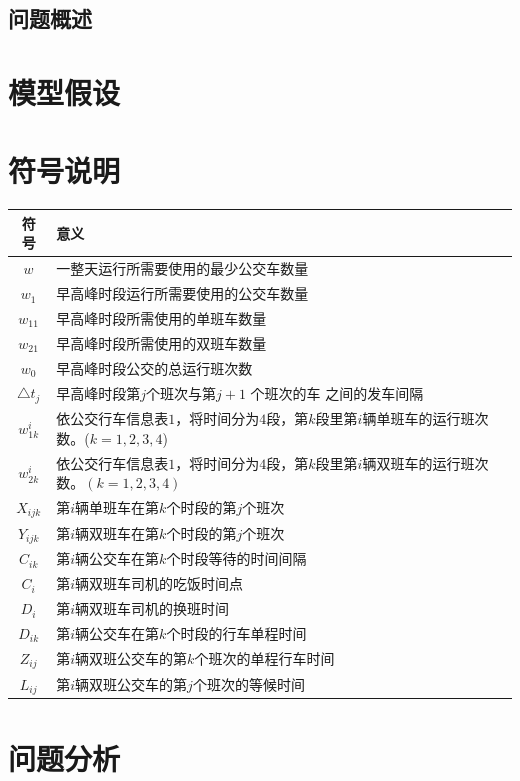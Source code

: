 \documentclass{ctexart}
\begin{document}
{	\subsection{问题概述}
	
	\section{模型假设}
	
	\section{符号说明}
	\begin{tabular}{cp{15cm}}
		\toprule
		符号  &  意义\\
		\midrule
		$w$  &  一整天运行所需要使用的最少公交车数量\\
		$w_1$  &  早高峰时段运行所需要使用的公交车数量\\
		$w_{11}$  &  早高峰时段所需使用的单班车数量\\
		$w_{21}$  &  早高峰时段所需使用的双班车数量\\
		$w_0$  &  早高峰时段公交的总运行班次数\\
		$\triangle t_j$  &  早高峰时段第$j$个班次与第$j+1$ 个班次的车
		之间的发车间隔\\
		$w_{1k}^i$  &  依公交行车信息表$1$，将时间分为$4$段，第$k$段里第$i$辆单班车的运行班次数。($k=1,2,3,4$)\\
		$w_{2k}^i$  &  依公交行车信息表$1$，将时间分为$4$段，第$k$段里第$i$辆双班车的运行班次数。$(k=1,2,3,4)$\\
		$X_{ijk}$  &  第$i$辆单班车在第$k$个时段的第$j$个班次\\
		$Y_{ijk}$  &  第$i$辆双班车在第$k$个时段的第$j$个班次\\
		$C_{ik}$  &  第$i$辆公交车在第$k$个时段等待的时间间隔\\
		$C_i$  &  第$i$辆双班车司机的吃饭时间点\\
		$D_i$  &  第$i$辆双班车司机的换班时间\\
		$D_{ik}$  &  第$i$辆公交车在第$k$个时段的行车单程时间\\
		$Z_{ij}$  &  第$i$辆双班公交车的第$k$个班次的单程行车时间\\
		$L_{ij}$  &  第$i$辆双班公交车的第$j$个班次的等候时间\\
		\bottomrule
	\end{tabular}
	
	\section{问题分析}
}
\end{document}
